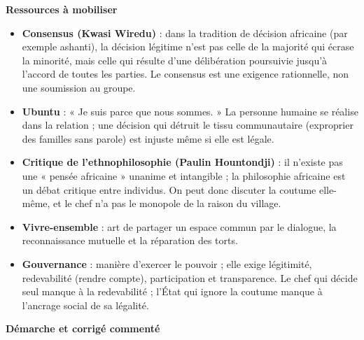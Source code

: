 \documentclass[11pt]{article}
\begin{document}
\textbf{Ressources à mobiliser}

\begin{aretenir}
\begin{itemize}
\item \textbf{Consensus (Kwasi Wiredu)} : dans la tradition de décision africaine (par exemple ashanti), la décision légitime n'est pas celle de la majorité qui écrase la minorité, mais celle qui résulte d'une délibération poursuivie jusqu'à l'accord de toutes les parties. Le consensus est une exigence rationnelle, non une soumission au groupe.
\item \textbf{Ubuntu} : « Je suis parce que nous sommes. » La personne humaine se réalise dans la relation ; une décision qui détruit le tissu communautaire (exproprier des familles sans parole) est injuste même si elle est légale.
\item \textbf{Critique de l'ethnophilosophie (Paulin Hountondji)} : il n'existe pas une « pensée africaine » unanime et intangible ; la philosophie africaine est un débat critique entre individus. On peut donc discuter la coutume elle-même, et le chef n'a pas le monopole de la raison du village.
\item \textbf{Vivre-ensemble} : art de partager un espace commun par le dialogue, la reconnaissance mutuelle et la réparation des torts.
\item \textbf{Gouvernance} : manière d'exercer le pouvoir ; elle exige légitimité, redevabilité (rendre compte), participation et transparence. Le chef qui décide seul manque à la redevabilité ; l'État qui ignore la coutume manque à l'ancrage social de sa légalité.
\end{itemize}
\end{aretenir}

\textbf{Démarche et corrigé commenté}
\end{document}
